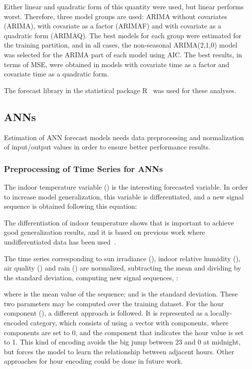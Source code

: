 \documentclass[energies,article,accept,moreauthors,pdftex,12pt,a4paper]{mdpi}
\newcommand{\ann}{ANN\xspace}
\begin{document}
Either linear and quadratic form of this quantity were used, but linear performs
worst. Therefore, three model groups are used: ARIMA without covariates (ARIMA), with
covariate  as a factor (ARIMAF) and with covariate  as a quadratic
form (ARIMAQ). The best models for each group were estimated for the training
partition, and in all cases, the non-seasonal ARIMA(2,1,0) model was selected for
the ARIMA part of each model using AIC. The best results, in terms of MSE,
were obtained in models with covariate time as a factor and covariate time as a
quadratic form.

The forecast library in the statistical package R~\cite{Rcommander} was used for
these analyses.

\subsection{ANNs}

Estimation of \ann forecast models needs data preprocessing and normalization of
input/output values in order to ensure better performance results.

\subsubsection{Preprocessing of Time Series for ANNs}

The indoor temperature variable () is the interesting forecasted variable. In
order to increase model generalization, this variable is differentiated, and a
new  signal sequence is obtained following
this equation:

\vspace {-9pt}


The differentiation of indoor temperature shows that is important to
achieve good generalization results, and it is based on previous work where undifferentiated data has been used~\cite{2012:kdir:zamora}.

The time series corresponding to sun irradiance (), indoor relative
humidity (), \linebreak air quality () and rain () are normalized,
subtracting the mean and dividing by the standard deviation, computing new signal
sequences, :


\vspace {-6 pt}

\noindent where  is the mean value of the sequence;
 and  is the standard
deviation. \linebreak These two parameters may be computed over the training dataset. For
the hour component (), a different approach is followed. It is represented
as a locally-encoded category, which consists of using a vector with 
components, where  components are set to 0, and the component that
indicates the hour value is set to 1. This kind of encoding avoids the big
jump between 23 and 0 at midnight, \linebreak but forces the model to learn the
relationship between adjacent hours. Other approaches for hour encoding could be
done in future work.
\end{document}
